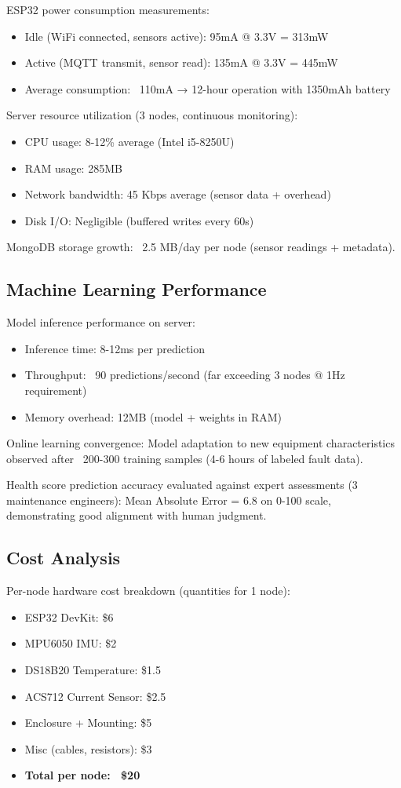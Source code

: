 \documentclass[conference]{IEEEtran}
\begin{document}
ESP32 power consumption measurements:
\begin{itemize}
\item Idle (WiFi connected, sensors active): 95mA @ 3.3V = 313mW
\item Active (MQTT transmit, sensor read): 135mA @ 3.3V = 445mW
\item Average consumption: ~110mA → 12-hour operation with 1350mAh battery
\end{itemize}

Server resource utilization (3 nodes, continuous monitoring):
\begin{itemize}
\item CPU usage: 8-12\% average (Intel i5-8250U)
\item RAM usage: 285MB
\item Network bandwidth: 45 Kbps average (sensor data + overhead)
\item Disk I/O: Negligible (buffered writes every 60s)
\end{itemize}

MongoDB storage growth: ~2.5 MB/day per node (sensor readings + metadata).

\subsection{Machine Learning Performance}

Model inference performance on server:
\begin{itemize}
\item Inference time: 8-12ms per prediction
\item Throughput: ~90 predictions/second (far exceeding 3 nodes @ 1Hz requirement)
\item Memory overhead: 12MB (model + weights in RAM)
\end{itemize}

Online learning convergence: Model adaptation to new equipment characteristics observed after ~200-300 training samples (4-6 hours of labeled fault data).

Health score prediction accuracy evaluated against expert assessments (3 maintenance engineers): Mean Absolute Error = 6.8 on 0-100 scale, demonstrating good alignment with human judgment.

\subsection{Cost Analysis}

Per-node hardware cost breakdown (quantities for 1 node):
\begin{itemize}
\item ESP32 DevKit: \$6
\item MPU6050 IMU: \$2
\item DS18B20 Temperature: \$1.5
\item ACS712 Current Sensor: \$2.5
\item Enclosure + Mounting: \$5
\item Misc (cables, resistors): \$3
\item \textbf{Total per node: ~\$20}
\end{itemize}
\end{document}
